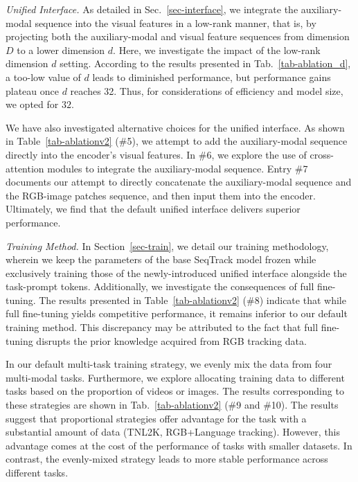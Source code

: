 \textit{Unified Interface.}
As detailed in Sec.~\ref{sec-interface}, we integrate the auxiliary-modal sequence into the visual features in a low-rank manner, that is,  by projecting both the auxiliary-modal and visual feature sequences from dimension $D$ to a lower dimension $d$. Here, we investigate the impact of the low-rank dimension $d$ setting. According to the results presented in Tab.~\ref{tab-ablation_d}, a too-low value of $d$ leads to diminished performance, but performance gains plateau once $d$ reaches 32. Thus, for considerations of efficiency and model size, we opted for $32$.

We have also investigated alternative choices for the unified interface. As shown in Table~\ref{tab-ablationv2} (\#5), we attempt to add the auxiliary-modal sequence directly into the encoder's visual features. In \#6, we explore the use of cross-attention modules to integrate the auxiliary-modal sequence. Entry \#7 documents our attempt to directly concatenate the auxiliary-modal sequence and the RGB-image patches sequence, and then input them into the encoder. Ultimately, we find that the default unified interface delivers superior performance.

\textit{Training Method.}
In Section~\ref{sec-train}, we detail our training methodology, wherein we keep the parameters of the base SeqTrack model frozen while exclusively training those of the newly-introduced unified interface alongside the task-prompt tokens. Additionally, we investigate the consequences of full fine-tuning. The results presented in Table~\ref{tab-ablationv2} (\#8) indicate that while full fine-tuning yields competitive performance, it remains inferior to our default training method. This discrepancy may be attributed to the fact that full fine-tuning disrupts the prior knowledge acquired from RGB tracking data.

In our default multi-task training strategy, we evenly mix the data from four multi-modal tasks. Furthermore, we explore allocating training data to different tasks based on the proportion of videos or images. The results corresponding to these strategies are shown in Tab.~\ref{tab-ablationv2} (\#9 and \#10). The results suggest that proportional strategies offer advantage for the task with a substantial amount of data (TNL2K, RGB+Language tracking). However, this advantage comes at the cost of the performance of tasks with smaller datasets. In contrast, the evenly-mixed strategy leads to more stable performance across different tasks.
  

